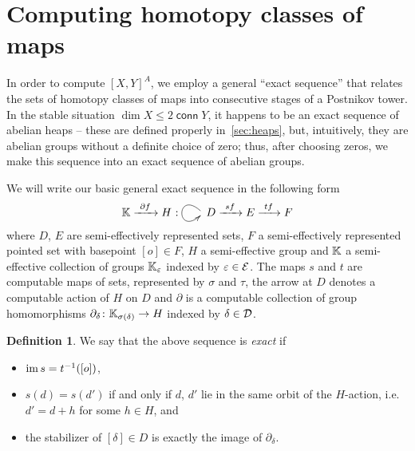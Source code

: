 \documentclass[12pt,a4wide]{article}
\makeatletter
\theoremstyle{plain}
\theoremstyle{definition}
\newtheorem*{sdefinition}{Definition}
\newcommand{\conn}{\mathop{\mathsf{conn}}}
\newcommand{\heading}[1]{\vspace{1ex}\par\noindent{\bf\boldmath #1}}
\renewcommand\:{\colon}
\newcommand{\acts}{\mathbin{\:\!\!\xymatrix@1@C=15pt{{} & {\phantom{|}} \ar@(ul,dl)[]_-{}}\!}}
\makeatother
\begin{document}
\section{Computing homotopy classes of maps}

In order to compute $[X, Y]^A$, we employ a general ``exact sequence'' that relates the sets of homotopy classes of maps into consecutive stages of a Postnikov tower. In the stable situation $\dim X \leq 2 \conn Y$, it happens to be an exact sequence of abelian heaps -- these are defined properly in~\ref{sec:heaps}, but, intuitively, they are abelian groups without a definite choice of zero; thus, after choosing zeros, we make this sequence into an exact sequence of abelian groups.

\heading{Exact sequences} \label{sec:abstract_exact_sequence}

\newcommand{\setone}{\bbK}
\newcommand{\settwo}{H}
\newcommand{\setthree}{D}
\newcommand{\setfour}{E}
\newcommand{\setfive}{F}
\newcommand{\calsetone}{\mcK}
\newcommand{\calsettwo}{\mcH}
\newcommand{\calsetthree}{\mcD}
\newcommand{\calsetfour}{\mcE}
\newcommand{\calsetfive}{\mcF}
\newcommand{\eltone}{k}
\newcommand{\elttwo}{h}
\newcommand{\eltthree}{d}
\newcommand{\eltfour}{e}
\newcommand{\eltfive}{f}
\newcommand{\caleltthree}{\delta}
\newcommand{\caleltfour}{\varepsilon}

We will write our basic general exact sequence in the following form
\[\setone \xlra{\partial} \settwo \acts \setthree \xlra{s} \setfour \xlra{t} \setfive\]
where $\setthree$, $\setfour$ are semi-effectively represented sets, $\setfive$ a semi-effectively represented pointed set with basepoint $[o] \in \setfive$, $\settwo$ a semi-effective group and $\setone$ a semi-effective collection of groups $\setone_\caleltfour$ indexed by $\caleltfour \in \calsetfour$. The maps $s$ and $t$ are computable maps of sets, represented by $\sigma$ and $\tau$, the arrow at $\setthree$ denotes a computable action of $\settwo$ on $\setthree$  and $\partial$ is a computable collection of group homomorphisms $\partial_\caleltthree \colon \setone_{\sigma(\caleltthree)} \to \settwo$ indexed by $\caleltthree \in \calsetthree$.

\begin{sdefinition}
We say that the above sequence is \emph{exact} if
\begin{itemize}[labelindent=.5em,leftmargin=*,label=$\bullet$,itemsep=0pt,parsep=0pt,topsep=0pt]
\item
	$\mathop\mathrm{im}\nolimits s = t^{-1}([o])$,
\item
	$s(\eltthree) = s(\eltthree')$ if and only if $\eltthree$, $\eltthree'$ lie in the same orbit of the $\settwo$-action, i.e.\ $\eltthree' = \eltthree + \elttwo$ for some $\elttwo \in \settwo$, and
\item
	the stabilizer of $[\caleltthree] \in \setthree$ is exactly the image of $\partial_\caleltthree$.
\end{itemize}
\end{sdefinition}
\end{document}
